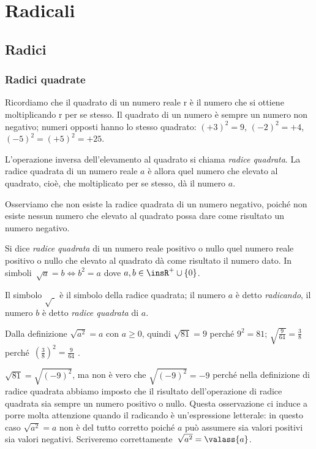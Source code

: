 \chapter{Radicali}
\section{Radici}
\subsection{Radici quadrate}
Ricordiamo che il quadrato di un numero reale r è il numero che si ottiene moltiplicando r per se stesso. Il quadrato di un numero è sempre un numero non negativo; numeri opposti hanno lo stesso quadrato: $(+3)^2=9$, $(-2)^2=+4$, $(-5)^2=(+5)^2=+25$.

L'operazione inversa dell'elevamento al quadrato si chiama \emph{radice quadrata}. La radice quadrata di un numero reale $a$ è allora quel numero che elevato al quadrato, cioè, che moltiplicato per se stesso, dà il numero $a$.

Osserviamo che non esiste la radice quadrata di un numero negativo, poiché non esiste nessun numero che elevato al quadrato possa dare come risultato un numero negativo.

\begin{definizione}
Si dice \emph{radice quadrata} di un numero reale positivo o nullo quel numero reale positivo o nullo che elevato al quadrato dà come risultato il numero dato.
In simboli~$\sqrt a=b \Leftrightarrow b^2=a$ dove $a,b\in \insR^{+}\cup \{0\}$.
\end{definizione}

Il simbolo $\sqrt{\,\,}$ è il simbolo della radice quadrata; il numero $a$ è detto \emph{radicando}, il numero $b$ è detto \emph{radice quadrata} di $a$.

Dalla definizione $\sqrt{a^2}=a$ con $a\ge 0$, quindi $\sqrt{81}=9$ perché $9^2=81$; $\sqrt{\frac 9{64}}=\frac 3 8$ perché~$\left(\frac 3 8\right)^2=\frac 9{64}$ .

\osservazione $\sqrt{81}=\sqrt{(-9)^2}$, ma non è vero che $\sqrt{(-9)^2}=-9$ perché nella definizione di radice quadrata abbiamo imposto che il risultato dell'operazione di radice quadrata sia sempre un numero positivo o nullo.
Questa osservazione ci induce a porre molta attenzione quando il radicando è un'espressione letterale: in questo caso $\sqrt{a^2}=a$ non è del tutto corretto poiché $a$ può assumere sia valori positivi sia valori negativi. Scriveremo correttamente~$\sqrt{a^2}=\valass{a}$.


